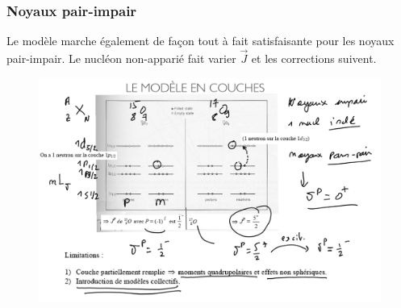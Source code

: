 \subsubsection{Noyaux pair-impair}
Le modèle marche également de façon tout à fait satisfaisante pour les noyaux pair-impair. Le nucléon non-apparié fait varier $\vec{J}$ et les corrections suivent.
\begin{figure}[H]
    \centering
    \includegraphics[width=\textwidth]{Images4/pair-impair.PNG}
\end{figure}













